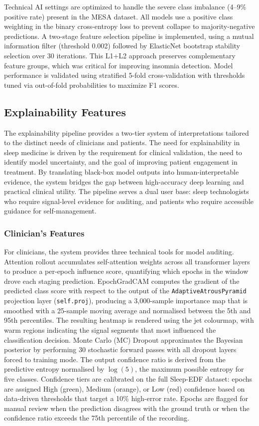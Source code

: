 \documentclass{ieeetj}
\begin{document}
Technical AI settings are optimized to handle the severe class imbalance (4--9\% positive rate) present in the MESA dataset. All models use a positive class weighting in the binary cross-entropy loss to prevent collapse to majority-negative predictions. A two-stage feature selection pipeline is implemented, using a mutual information filter (threshold 0.002) followed by ElasticNet bootstrap stability selection over 30 iterations. This L1+L2 approach preserves complementary feature groups, which was critical for improving insomnia detection. Model performance is validated using stratified 5-fold cross-validation with thresholds tuned via out-of-fold probabilities to maximize F1 scores.

\subsection{Explainability Features}
The explainability pipeline provides a two-tier system of interpretations tailored to the distinct needs of clinicians and patients. The need for explainability in sleep medicine is driven by the requirement for clinical validation, the need to identify model uncertainty, and the goal of improving patient engagement in treatment. By translating black-box model outputs into human-interpretable evidence, the system bridges the gap between high-accuracy deep learning and practical clinical utility. The pipeline serves a dual user base: sleep technologists who require signal-level evidence for auditing, and patients who require accessible guidance for self-management.

\subsubsection{Clinician's Features}
For clinicians, the system provides three technical tools for model auditing. Attention rollout accumulates self-attention weights across all transformer layers to produce a per-epoch influence score, quantifying which epochs in the window drove each staging prediction. EpochGradCAM computes the gradient of the predicted class score with respect to the output of the \texttt{AdaptiveAtrousPyramid} projection layer (\texttt{self.proj}), producing a 3,000-sample importance map that is smoothed with a 25-sample moving average and normalised between the 5th and 95th percentiles. The resulting heatmap is rendered using the jet colourmap, with warm regions indicating the signal segments that most influenced the classification decision. Monte Carlo (MC) Dropout approximates the Bayesian posterior by performing 30 stochastic forward passes with all dropout layers forced to training mode. The output confidence ratio is derived from the predictive entropy normalised by $\log(5)$, the maximum possible entropy for five classes. Confidence tiers are calibrated on the full Sleep-EDF dataset: epochs are assigned High (green), Medium (orange), or Low (red) confidence based on data-driven thresholds that target a 10\% high-error rate. Epochs are flagged for manual review when the prediction disagrees with the ground truth or when the confidence ratio exceeds the 75th percentile of the recording.
\end{document}
